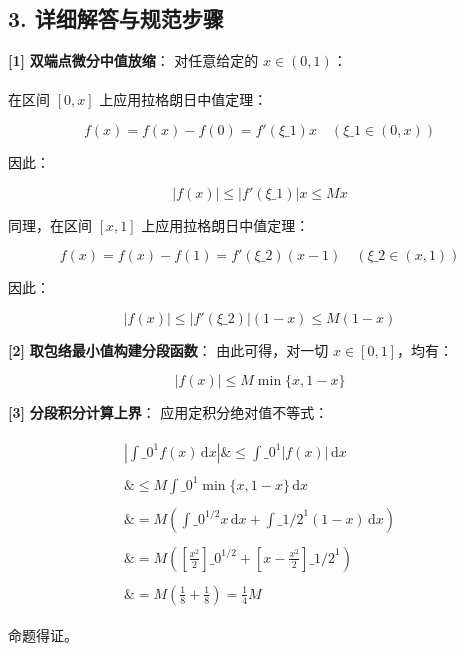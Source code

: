 \documentclass[11pt,a4paper,UTF8]{ctexart}
\begin{document}
\subsection{3. 详细解答与规范步骤}
\begin{solbox}[分步推导与答题规范]
\textbf{[1]}  \textbf{双端点微分中值放缩}：
对任意给定的 $x \in (0, 1)$：\\ \\
在区间 $[0, x]$ 上应用拉格朗日中值定理：

\begin{equation*}
f(x) = f(x) - f(0) = f'(\xi\_1) x \quad (\xi\_1 \in (0, x))
\end{equation*}

因此：

\begin{equation*}
|f(x)| \le |f'(\xi\_1)| x \le M x
\end{equation*}

同理，在区间 $[x, 1]$ 上应用拉格朗日中值定理：

\begin{equation*}
f(x) = f(x) - f(1) = f'(\xi\_2) (x - 1) \quad (\xi\_2 \in (x, 1))
\end{equation*}

因此：

\begin{equation*}
|f(x)| \le |f'(\xi\_2)| (1 - x) \le M (1 - x)
\end{equation*}


\textbf{[2]}  \textbf{取包络最小值构建分段函数}：
由此可得，对一切 $x \in [0, 1]$，均有：

\begin{equation*}
|f(x)| \le M \min\{x, 1-x\}
\end{equation*}


\textbf{[3]}  \textbf{分段积分计算上界}：
应用定积分绝对值不等式：

\begin{align*}
\begin{aligned}
\left| \int\_0^1 f(x)\,\mathrm{d}x \right| \&\le \int\_0^1 |f(x)|\,\mathrm{d}x \\ \\
\&\le M \int\_0^1 \min\{x, 1-x\}\,\mathrm{d}x \\ \\
\&= M \left( \int\_0^{1/2} x\,\mathrm{d}x + \int\_{1/2}^1 (1-x)\,\mathrm{d}x \right) \\ \\
\&= M \left( \left[ \frac{x^2}{2} \right]\_0^{1/2} + \left[ x - \frac{x^2}{2} \right]\_{1/2}^1 \right) \\ \\
\&= M \left( \frac{1}{8} + \frac{1}{8} \right) = \frac{1}{4}M
\end{aligned}
\end{align*}

命题得证。
\end{solbox}
\end{document}
